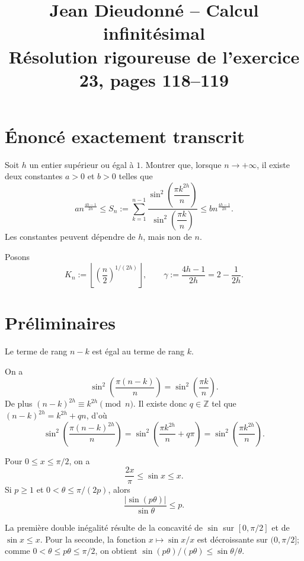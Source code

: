 \documentclass[11pt,a4paper]{article}
\title{Jean Dieudonné -- Calcul infinitésimal\\
\large Résolution rigoureuse de l'exercice 23, pages 118--119}
\author{}
\date{}
\begin{document}
\maketitle

\section{Énoncé exactement transcrit}

\begin{theorembox}
Soit $h$ un entier supérieur ou égal à $1$. Montrer que, lorsque
$n\to+\infty$, il existe deux constantes $a>0$ et $b>0$ telles que
\[
a n^{\frac{4h-1}{2h}}
\leq
S_n:=\sum_{k=1}^{n-1}
\frac{\sin^2\!\left(\dfrac{\pi k^{2h}}{n}\right)}
     {\sin^2\!\left(\dfrac{\pi k}{n}\right)}
\leq
b n^{\frac{4h-1}{2h}}.
\]
Les constantes peuvent dépendre de $h$, mais non de $n$.
\end{theorembox}

Posons
\[
K_n:=\left\lfloor\left(\frac n2\right)^{1/(2h)}\right\rfloor,
\qquad \gamma:=\frac{4h-1}{2h}=2-\frac1{2h}.
\]

\section{Préliminaires}

\begin{lemmabox}[title=Symétrie]
Le terme de rang $n-k$ est égal au terme de rang $k$.
\end{lemmabox}
\begin{proofbox}
On a
\[
\sin^2\left(\frac{\pi(n-k)}n\right)
=\sin^2\left(\frac{\pi k}n\right).
\]
De plus $(n-k)^{2h}\equiv k^{2h}\pmod n$. Il existe donc $q\in\mathbb Z$
tel que $(n-k)^{2h}=k^{2h}+qn$, d'où
\[
\sin^2\left(\frac{\pi(n-k)^{2h}}n\right)
=\sin^2\left(\frac{\pi k^{2h}}n+q\pi\right)
=\sin^2\left(\frac{\pi k^{2h}}n\right).
\]
\end{proofbox}

\begin{lemmabox}[title=Deux inégalités trigonométriques]
Pour $0\leq x\leq\pi/2$, on a
\[
\frac{2x}{\pi}\leq\sin x\leq x.
\]
Si $p\geq1$ et $0<\theta\leq\pi/(2p)$, alors
\[
\frac{|\sin(p\theta)|}{\sin\theta}\leq p.
\]
\end{lemmabox}
\begin{proofbox}
La première double inégalité résulte de la concavité de $\sin$ sur
$[0,\pi/2]$ et de $\sin x\leq x$. Pour la seconde, la fonction
$x\mapsto\sin x/x$ est décroissante sur $(0,\pi/2]$; comme
$0<\theta\leq p\theta\leq\pi/2$, on obtient
$\sin(p\theta)/(p\theta)\leq\sin\theta/\theta$.
\end{proofbox}
\end{document}
